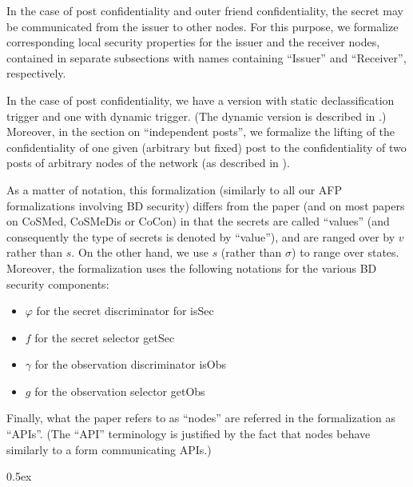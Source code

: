 \documentclass[11pt,a4paper]{article}
\begin{document}
In the case of post confidentiality and outer friend confidentiality, the
secret may be communicated from the issuer to other nodes. For this purpose, we
formalize corresponding local security properties for the issuer and the
receiver nodes, contained in separate subsections with names containing ``Issuer'' and
``Receiver'', respectively.

In the case of post confidentiality, we have a version with
static declassification trigger and one with dynamic trigger. (The dynamic version is described  in \cite[Appendix~C]{cosmedis-SandP2017}.)
Moreover, in the
section on ``independent posts'', we formalize the lifting of
the confidentiality of
one given (arbitrary but fixed) post to the confidentiality of two posts of
arbitrary nodes of the network (as described in \cite[Appendix~E]{cosmedis-SandP2017}).

As a matter of notation, this formalization (similarly to all our AFP formalizations involving BD security)
differs from the paper \cite{cosmedis-SandP2017}
(and on most papers on CoSMed, CoSMeDis or CoCon)
in
that the secrets are called ``values'' (and consequently the type of secrets is
denoted by ``value''), and are ranged over by $v$ rather than $s$. On the other
hand, we use $s$ (rather than $\sigma$) to range over states.
%
Moreover, the formalization uses the following notations for the various BD
security components:
\begin{itemize}
\item $\varphi$ for the secret discriminator for isSec
\item $f$ for the secret selector getSec
\item $\gamma$ for the observation discriminator  isObs
\item $g$  for the observation selector getObs
\end{itemize}

Finally, what the paper  \cite{cosmedis-SandP2017}  refers to as ``nodes'' are referred in the formalization as ``APIs''. (The ``API'' terminology is justified by the fact that nodes behave similarly to a form communicating APIs.)


\parindent 0pt\parskip 0.5ex





\end{document}
